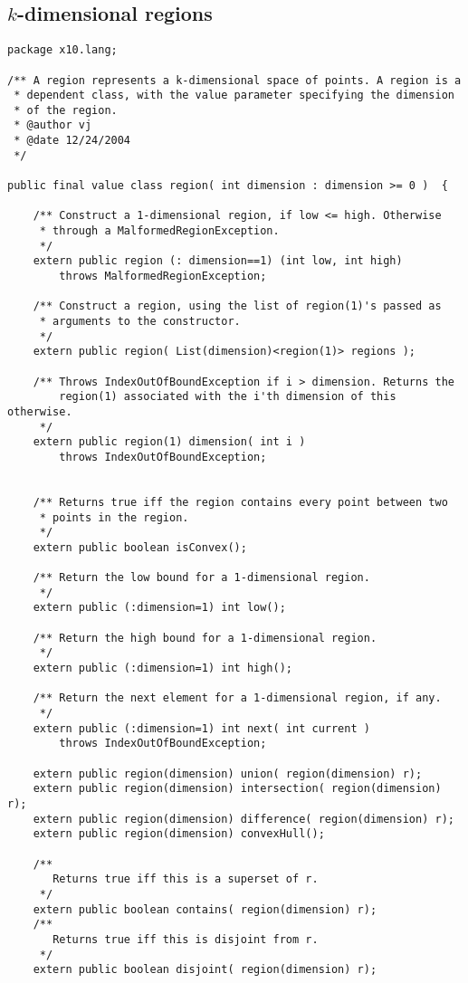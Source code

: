 \documentclass[nocopyrightspace,preprint,9pt]{sigplanconf}
\begin{document}
\subsection{$k$-dimensional regions}
{\footnotesize
\begin{verbatim}
package x10.lang;

/** A region represents a k-dimensional space of points. A region is a
 * dependent class, with the value parameter specifying the dimension
 * of the region.
 * @author vj
 * @date 12/24/2004
 */

public final value class region( int dimension : dimension >= 0 )  {

    /** Construct a 1-dimensional region, if low <= high. Otherwise
     * through a MalformedRegionException.
     */
    extern public region (: dimension==1) (int low, int high)
        throws MalformedRegionException;

    /** Construct a region, using the list of region(1)'s passed as
     * arguments to the constructor.
     */
    extern public region( List(dimension)<region(1)> regions );

    /** Throws IndexOutOfBoundException if i > dimension. Returns the
        region(1) associated with the i'th dimension of this otherwise.
     */
    extern public region(1) dimension( int i )
        throws IndexOutOfBoundException;


    /** Returns true iff the region contains every point between two
     * points in the region.
     */
    extern public boolean isConvex();

    /** Return the low bound for a 1-dimensional region.
     */
    extern public (:dimension=1) int low();

    /** Return the high bound for a 1-dimensional region.
     */
    extern public (:dimension=1) int high();

    /** Return the next element for a 1-dimensional region, if any.
     */
    extern public (:dimension=1) int next( int current )
        throws IndexOutOfBoundException;

    extern public region(dimension) union( region(dimension) r);
    extern public region(dimension) intersection( region(dimension) r);
    extern public region(dimension) difference( region(dimension) r);
    extern public region(dimension) convexHull();

    /**
       Returns true iff this is a superset of r.
     */
    extern public boolean contains( region(dimension) r);
    /**
       Returns true iff this is disjoint from r.
     */
    extern public boolean disjoint( region(dimension) r);


\end{verbatim}}
\end{document}
